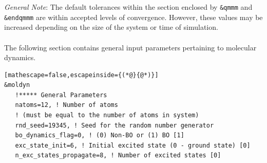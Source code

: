 \documentclass[letterpaper,12pt,titlepage]{article}
\begin{document}
\noindent \textit{General Note}: The default tolerances within the section enclosed by \verb+&qmmm+ and \verb+&endqmmm+ are within accepted levels of convergence.  However, these values may be increased depending on the size of the system or time of simulation.
\\
\\
The following section contains general input parameters pertaining to molecular dynamics.
\begin{lstlisting}[mathescape=false,escapeinside={(*@}{@*)}]
&moldyn
   !***** General Parameters
   natoms=12, ! Number of atoms 
   ! (must be equal to the number of atoms in system)
   rnd_seed=19345, ! Seed for the random number generator
   bo_dynamics_flag=0, ! (0) Non-BO or (1) BO [1]
   exc_state_init=6, ! Initial excited state (0 - ground state) [0]
   n_exc_states_propagate=8, ! Number of excited states [0]
\end{lstlisting}
\end{document}
